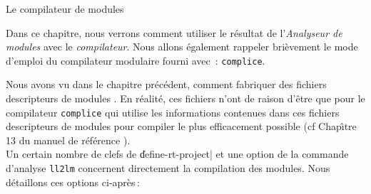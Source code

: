  {Le compilateur de modules}

Dans ce chapitre, nous verrons comment utiliser le r\'{e}sultat de
l'{\em Analyseur de modules} avec le
{\em compilateur}.
Nous allons \'{e}galement rappeler bri\`{e}vement le mode d'emploi du
compilateur modulaire fourni avec \LeLisp\,: {\tt complice}. 


Nous avons vu dans le chapitre pr\'{e}c\'{e}dent, comment fabriquer des
fichiers descripteurs de modules \LeLisp. 
En r\'{e}alit\'{e}, ces fichiers n'ont de raison d'\^{e}tre que
pour le compilateur {\tt complice} qui utilise les informations
contenues dans ces fichiers descripteurs de modules pour compiler 
le plus efficacement possible (cf Chap\^{\i}tre 13 du manuel de
r\'{e}f\'{e}rence \LeLisp ).\\

Un certain nombre de clefs de \|define-rt-project| et une option de la
commande d'analyse {\tt ll2lm} 
concernent directement la compilation des modules. Nous d\'{e}taillons
ces options ci-apr\`{e}s\,:


